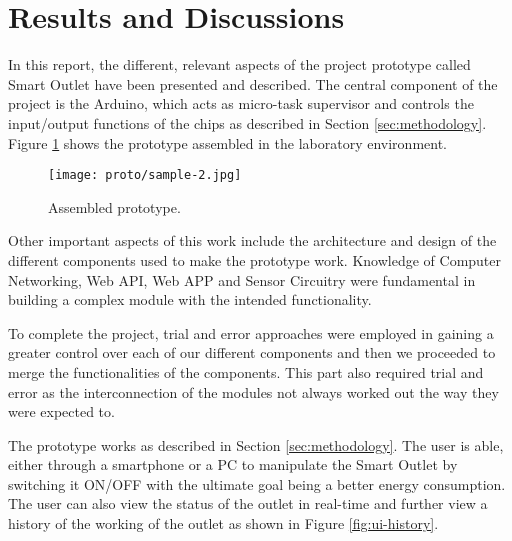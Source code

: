 %
%
%
%






\section{Results and Discussions}
\label{sec:res-and-disc}

In this report, the different, relevant aspects of the project prototype called
Smart Outlet have been presented and described. The central component of the
project is the Arduino, which acts as micro-task supervisor and controls the
input/output functions of the chips as described in Section
\ref{sec:methodology}. Figure \ref{fig:proto} shows the prototype
assembled in the laboratory environment.

\begin{figure}[ht!]
    \centering
    \texttt{[image: proto/sample-2.jpg]}
    \caption{Assembled prototype.}
    \label{fig:proto}
\end{figure}

Other important aspects of this work include the architecture and design of
the different components used to make the prototype work. Knowledge of
Computer Networking, Web API, Web APP and Sensor Circuitry were fundamental in
building a complex module with the intended functionality.

To complete the project, trial and error approaches were employed in
gaining a greater control over each of our different components and then we
proceeded to merge the functionalities of the components. This part
also required trial and error as the interconnection of the modules not always
worked out the way they were expected to.

The prototype works as described in Section \ref{sec:methodology}. The user is able, 
either through a smartphone or a PC to manipulate the Smart Outlet by
switching it ON/OFF with the ultimate goal being a better energy consumption.
The user can also view the status of the outlet in real-time and further view a
history of the working of the outlet as shown in Figure \ref{fig:ui-history}.

